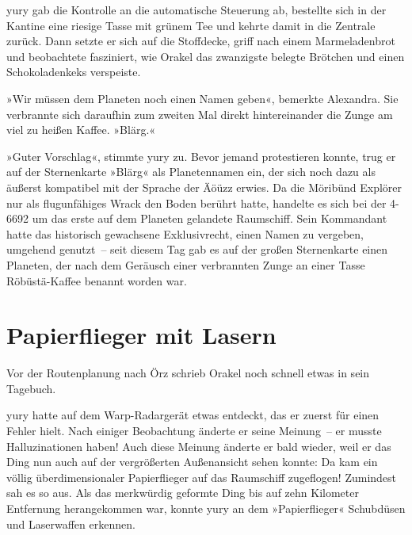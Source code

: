 yury gab die Kontrolle an die automatische Steuerung ab, bestellte sich in der Kantine eine riesige Tasse mit grünem Tee und kehrte damit in die Zentrale zurück. Dann setzte er sich auf die Stoffdecke, griff nach einem Marmeladenbrot und beobachtete fasziniert, wie Orakel das zwanzigste belegte Brötchen und einen Schokoladenkeks verspeiste.

»Wir müssen dem Planeten noch einen Namen geben«, bemerkte Alexandra. Sie verbrannte sich daraufhin zum zweiten Mal direkt hintereinander die Zunge am viel zu heißen Kaffee. »Blärg.«

»Guter Vorschlag«, stimmte yury zu. Bevor jemand protestieren konnte, trug er auf der Sternenkarte »Blärg« als Planetennamen ein, der sich noch dazu als äußerst kompatibel mit der Sprache der Äöüzz erwies. Da die Möribünd Explörer nur als flugunfähiges Wrack den Boden berührt hatte, handelte es sich bei der 4-6692 um das erste auf dem Planeten gelandete Raumschiff. Sein Kommandant hatte das historisch gewachsene Exklusivrecht, einen Namen zu vergeben, umgehend genutzt~– seit diesem Tag gab es auf der großen Sternenkarte einen Planeten, der nach dem Geräusch einer verbrannten Zunge an einer Tasse Röbüstä-Kaffee benannt worden war.


\chapter{Papierflieger mit Lasern}

Vor der Routenplanung nach Örz schrieb Orakel noch schnell etwas in sein Tagebuch.



yury hatte auf dem Warp-Radargerät etwas entdeckt, das er zuerst für einen Fehler hielt. Nach einiger Beobachtung änderte er seine Meinung~– er musste Halluzinationen haben! Auch diese Meinung änderte er bald wieder, weil er das Ding nun auch auf der vergrößerten Außenansicht sehen konnte: Da kam ein völlig überdimensionaler Papierflieger auf das Raumschiff zugeflogen! Zumindest sah es so aus. Als das merkwürdig geformte Ding bis auf zehn Kilometer Entfernung herangekommen war, konnte yury an dem »Papierflieger« Schubdüsen und Laserwaffen erkennen.

